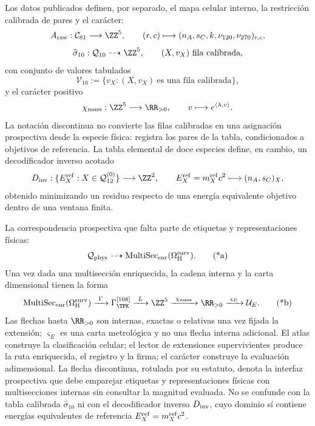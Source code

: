 Los datos publicados definen, por separado, el mapa celular interno, la
restricción calibrada de pares y el carácter:
\[
 A_{\rm raw}:\mathcal C_{81}\longrightarrow\ZZ^5,
 \qquad
 (r,c)\longmapsto
 (n_A,s_C,k,\nu_{120},\nu_{270})_{r,c},
\]
\[
 \widehat\sigma_{10}:\mathcal Q_{10}
 \dashrightarrow\ZZ^5,
 \qquad (X,v_X)\ \text{fila calibrada},
\]
con conjunto de valores tabulados
\[
 \mathcal V_{10}:=\{v_X:(X,v_X)\ \text{es una fila calibrada}\},
\]
y el carácter positivo
\[
 \chi_{\rm mass}:\ZZ^5\longrightarrow\RR_{>0},
 \qquad v\longmapsto e^{\langle\lambda,v\rangle}.
\]
La notación discontinua no convierte las filas calibradas en una asignación
prospectiva desde la especie física: registra los pares de la tabla,
condicionados a objetivos de referencia. La tabla elemental de doce especies
define, en cambio, un decodificador inverso acotado
\[
 D_{\rm inv}:
 \{E_X^{\rm ref}:X\in\mathcal Q_{12}^{(0)}\}
 \longrightarrow\ZZ^2,
 \qquad
 E_X^{\rm ref}=m_X^{\rm ref}c^2
 \longmapsto(n_A,s_C)_X,
\]
obtenido minimizando un residuo respecto de una energía equivalente objetivo
dentro de una ventana finita.

La correspondencia prospectiva que falta parte de etiquetas y
representaciones físicas:
\[
 \mathcal Q_{\rm phys}
 \dashrightarrow
 \operatorname{MultiSec}_{\rm enr}(\Omega_{\rm H}^{\rm surv}).
 \tag{*a}
\]
Una vez dada una multisección enriquecida, la cadena interna y la carta
dimensional tienen la forma
\[
 \operatorname{MultiSec}_{\rm enr}(\Omega_{\rm H}^{\rm surv})
 \xrightarrow{\ \Gamma\ }
 \Gamma_{\TPK}^{[108]}
 \xrightarrow{\ L\ }
 \ZZ^5
 \xrightarrow{\ \chi_{\rm mass}\ }
 \RR_{>0}
 \xrightarrow{\ \varsigma_E\ }
 \mathcal U_E.
 \tag{*b}
\]
Las flechas hasta \(\RR_{>0}\) son internas, exactas o relativas una vez
fijada la extensión; \(\varsigma_E\) es una carta metrológica y no una flecha
interna adicional. El atlas construye la clasificación celular; el lector de extensiones
supervivientes produce la ruta enriquecida, el registro y la firma; el
carácter construye la evaluación adimensional. La flecha discontinua, rotulada
por su estatuto, denota la interfaz prospectiva que debe emparejar etiquetas y representaciones
físicas con multisecciones internas sin consultar la magnitud evaluada. No se
confunde con la tabla calibrada \(\widehat\sigma_{10}\) ni con el
decodificador inverso \(D_{\rm inv}\), cuyo dominio sí contiene energías
equivalentes de referencia \(E_X^{\rm ref}=m_X^{\rm ref}c^2\).

